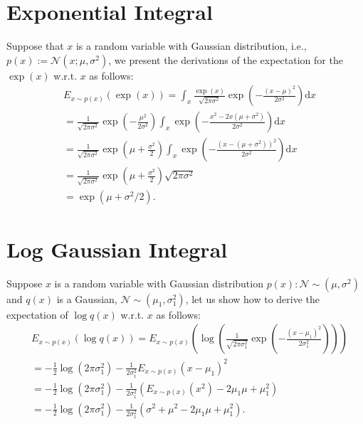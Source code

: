 \newpage
{}
\section{Exponential Integral}
\label{app:exponentialIntegral}
Suppose that $x$ is a random variable with Gaussian distribution, i.e., $p(x):=\mathcal{N}(x; \mu, \sigma^2)$, we present the derivations of the expectation for the $\exp(x)$ w.r.t. $x$ as follows:
\begin{align*}
    &E_{x\sim p(x)}(\exp(x)) =\int_{x} \frac{\exp(x)}{\sqrt{2\pi \sigma^2}} \exp\left(-\frac{(x-\mu)^2}{2\sigma^2}\right)\mathrm{d}x \\
    &=\frac{1}{\sqrt{2\pi \sigma^2}} \exp\left(-\frac{\mu^2}{2\sigma^2}\right)\int_{x} \exp\left(-\frac{x^{2}-2x(\mu+\sigma^2)}{2\sigma^2}\right)\mathrm{d}x \\
    &=\frac{1}{\sqrt{2\pi \sigma^2}} \exp\left(\mu + \frac{\sigma^2}{2}\right) \int_{x} \exp\left(-\frac{(x-(\mu+\sigma^2))^2}{2\sigma^2}\right)\mathrm{d}x\\
    &=\frac{1}{\sqrt{2\pi \sigma^2}} \exp\left(\mu + \frac{\sigma^2}{2}\right) \sqrt{2\pi \sigma^2 } \\
    &=\exp(\mu+\sigma^2/2).
\end{align*}

\section{Log Gaussian Integral}
\label{app:logGaussianIntegral}
Suppose $x$ is a random variable with Gaussian distribution $p(x): \mathcal{N}\sim(\mu, \sigma^2)$ and $q(x)$ is a Gaussian, $\mathcal{N}\sim(\mu_1, \sigma_1^2)$, let us show how to derive the expectation of $\log q(x)$ w.r.t. $x$ as follows:
\begin{align*}
    &E_{x\sim p(x)}( \log q(x) ) =E_{x \sim p(x)} \left(\log\left(\frac{1}{\sqrt{2\pi\sigma_1^2}}\exp\left(-\frac{(x-\mu_1)^2}{2\sigma_1^2}\right)\right)\right)\\
   &= -\frac{1}{2}\log(2\pi\sigma_{1}^2) - \frac{1}{2\sigma_{1}^2}E_{x\sim p(x)}( x-\mu_{1} )^2 \\
    &= -\frac{1}{2}\log(2\pi\sigma_{1}^2) - \frac{1}{2\sigma_{1}^2}\left(E_{x\sim p(x)}( x^2 )-2\mu_1\mu + \mu_{1}^2 \right) \\
    &= -\frac{1}{2}\log(2\pi\sigma_{1}^2) - \frac{1}{2\sigma_{1}^2}\left(\sigma^2 + \mu^2-2\mu_1\mu + \mu_{1}^2 \right).
\end{align*}




